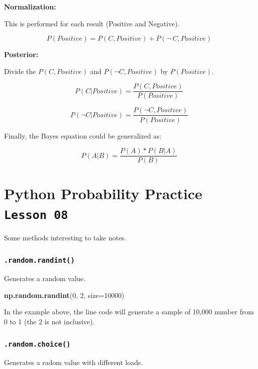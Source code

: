 \documentclass[]{book}
\newenvironment{Shaded}{\begin{snugshade}}{\end{snugshade}}
\newcommand{\KeywordTok}[1]{\textcolor[rgb]{0.13,0.29,0.53}{\textbf{#1}}}
\newcommand{\DataTypeTok}[1]{\textcolor[rgb]{0.13,0.29,0.53}{#1}}
\newcommand{\DecValTok}[1]{\textcolor[rgb]{0.00,0.00,0.81}{#1}}
\newcommand{\NormalTok}[1]{#1}
\begin{document}
\textbf{Normalization:}

This is performed for each result (Positive and Negative).

\[ P(Positive) = P(C,Positive) + P(\neg \ C,Positive) \tag{4}\]

\textbf{Posterior:}

Divide the \(P(C,Positive)\) and \(P(\neg C,Positive)\) by
\(P(Positive)\).

\[P(C|Positive) = \frac{P(C,Positive)}{P(Positive)} \tag{5}\]

\[P(\neg C|Positive) = \frac{P(\neg C,Positive)}{P(Positive)} \tag{6}\]

Finally, the Bayes equation could be generalized as:

\[P(A|B) = \frac{P(A) * P(B|A)}{P(B)} \tag{7}\]

\section{\texorpdfstring{Python Probability Practice
\texttt{Lesson\ 08}}{Python Probability Practice Lesson 08}}\label{python-probability-practice-lesson-08}

Some methods interesting to take notes.

\subsubsection{\texorpdfstring{\texttt{.random.randint()}}{.random.randint()}}\label{random.randint}

Generates a random value.

\begin{Shaded}
\begin{Highlighting}[]
\KeywordTok{np.random.randint}\NormalTok{(}\DecValTok{0}\NormalTok{, }\DecValTok{2}\NormalTok{, }\DataTypeTok{size=}\DecValTok{10000}\NormalTok{)}
\end{Highlighting}
\end{Shaded}

In the example above, the line code will generate a sample of 10,000
number from 0 to 1 (the 2 is not inclusive).

\subsubsection{\texorpdfstring{\texttt{.random.choice()}}{.random.choice()}}\label{random.choice}

Generates a radom value with different loads.
\end{document}
